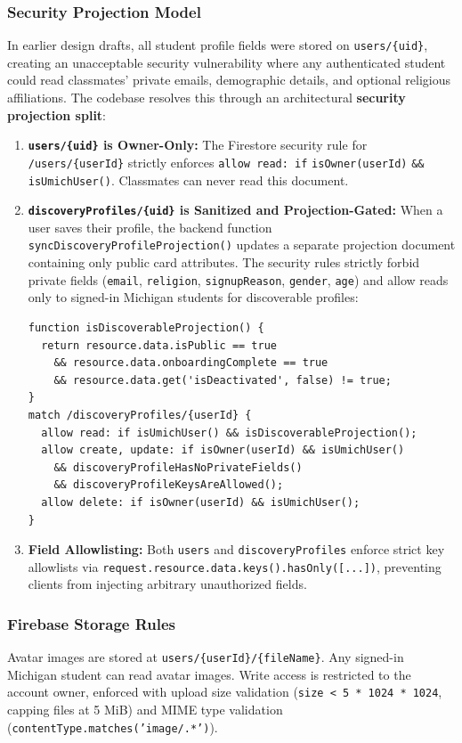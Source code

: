 \documentclass[11pt,letterpaper]{article}
\begin{document}
\subsubsection*{Security Projection Model}
In earlier design drafts, all student profile fields were stored on \texttt{users/\{uid\}}, creating an unacceptable security vulnerability where any authenticated student could read classmates' private emails, demographic details, and optional religious affiliations. The codebase resolves this through an architectural \textbf{security projection split}:
\begin{enumerate}[leftmargin=*,noitemsep]
\item \textbf{\texttt{users/\{uid\}} is Owner-Only:} The Firestore security rule for \texttt{/users/\{userId\}} strictly enforces \texttt{allow read: if} \allowbreak\texttt{isOwner(userId)} \allowbreak\texttt{\&\& isUmichUser()}. Classmates can never read this document.
\item \textbf{\texttt{discoveryProfiles/}\allowbreak\texttt{\{uid\}} is Sanitized and Projection-Gated:} When a user saves their profile, the backend function \texttt{syncDiscoveryProfile}\allowbreak\texttt{Projection()} updates a separate projection document containing only public card attributes. The security rules strictly forbid private fields (\texttt{email}, \texttt{religion}, \texttt{signupReason}, \texttt{gender}, \texttt{age}) and allow reads only to signed-in Michigan students for discoverable profiles:
\begin{lstlisting}
function isDiscoverableProjection() {
  return resource.data.isPublic == true
    && resource.data.onboardingComplete == true
    && resource.data.get('isDeactivated', false) != true;
}
match /discoveryProfiles/{userId} {
  allow read: if isUmichUser() && isDiscoverableProjection();
  allow create, update: if isOwner(userId) && isUmichUser()
    && discoveryProfileHasNoPrivateFields()
    && discoveryProfileKeysAreAllowed();
  allow delete: if isOwner(userId) && isUmichUser();
}
\end{lstlisting}
\item \textbf{Field Allowlisting:} Both \texttt{users} and \texttt{discoveryProfiles} enforce strict key allowlists via \texttt{request.resource.data.}\allowbreak\texttt{keys().hasOnly([...])}, preventing clients from injecting arbitrary unauthorized fields.
\end{enumerate}

\subsubsection*{Firebase Storage Rules}
Avatar images are stored at \texttt{users/\{userId\}/\{fileName\}}. Any signed-in Michigan student can read avatar images. Write access is restricted to the account owner, enforced with upload size validation (\texttt{size < 5 * 1024 * 1024}, capping files at 5 MiB) and MIME type validation (\texttt{contentType.matches('image/.*')}).
\end{document}
